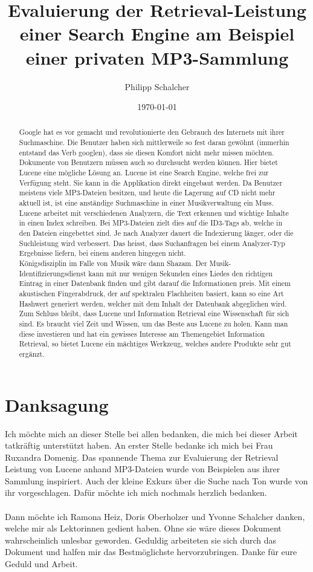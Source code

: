 \documentclass[12pt,a4paper,ngerman]{report}
\author{Philipp Schalcher}
\title{Evaluierung der Retrieval-Leistung einer Search Engine am Beispiel einer privaten MP3-Sammlung}
\date{\today}
\begin{document}

\chapter*{Danksagung}
Ich möchte mich an dieser Stelle bei allen bedanken, die mich bei dieser Arbeit tatkräftig
unterstützt haben.
An erster Stelle bedanke ich mich bei Frau Ruxandra Domenig. Das spannende Thema zur Evaluierung der Retrieval Leistung von Lucene anhand MP3-Dateien wurde von Beispielen aus ihrer Sammlung inspiriert. Auch der kleine Exkurs über die Suche nach Ton wurde von ihr vorgeschlagen. Dafür möchte ich mich nochmals herzlich bedanken.\\
\\
Dann möchte ich Ramona Heiz, Doris Oberholzer und Yvonne Schalcher danken, welche mir als Lektorinnen gedient haben. Ohne sie wäre dieses Dokument wahrscheinlich unlesbar geworden. Geduldig arbeiteten sie sich durch das Dokument und halfen mir das Bestmöglichste hervorzubringen. Danke für eure Geduld und Arbeit.
\tableofcontents
\begin{abstract}
Google hat es vor gemacht und revolutionierte den Gebrauch des Internets mit ihrer Suchmaschine. Die Benutzer haben sich mittlerweile so fest daran gewöhnt (immerhin entstand das Verb googlen), dass sie diesen Komfort nicht mehr missen möchten.\\
Dokumente von Benutzern müssen auch so durchsucht werden können. Hier bietet Lucene eine mögliche Lösung an. Lucene ist eine Search Engine, welche frei zur Verfügung steht. Sie kann in die Applikation direkt eingebaut werden. Da Benutzer meistens viele MP3-Dateien besitzen, und heute die Lagerung auf CD nicht mehr aktuell ist, ist eine anständige Suchmaschine in einer Musikverwaltung ein Muss. Lucene arbeitet mit verschiedenen Analyzern, die Text erkennen und wichtige Inhalte in einen Index schreiben. Bei MP3-Dateien zielt dies auf die ID3-Tags ab, welche in den Dateien eingebettet sind. Je nach Analyzer dauert die Indexierung länger, oder die Suchleistung wird verbessert. Das heisst, dass Suchanfragen bei einem Analyzer-Typ Ergebnisse liefern, bei einem anderen hingegen nicht.\\
Königsdisziplin im Falle von Musik wäre dann Shazam. Der Musik-Identifizierungsdienst kann mit nur wenigen Sekunden eines Liedes den richtigen Eintrag in einer Datenbank finden und gibt darauf die Informationen preis. Mit einem akustischen Fingerabdruck, der auf spektralen Flachheiten basiert, kann so eine Art Hashwert generiert werden, welcher mit dem Inhalt der Datenbank abgeglichen wird.\\
Zum Schluss bleibt, dass Lucene und Information Retrieval eine Wissenschaft für sich sind. Es braucht viel Zeit und Wissen, um das Beste aus Lucene zu holen. Kann man diese investieren und hat ein gewisses Interesse am Themengebiet Information Retrieval, so bietet Lucene ein mächtiges Werkzeug, welches andere Produkte sehr gut ergänzt.
\end{abstract}
\end{document}

